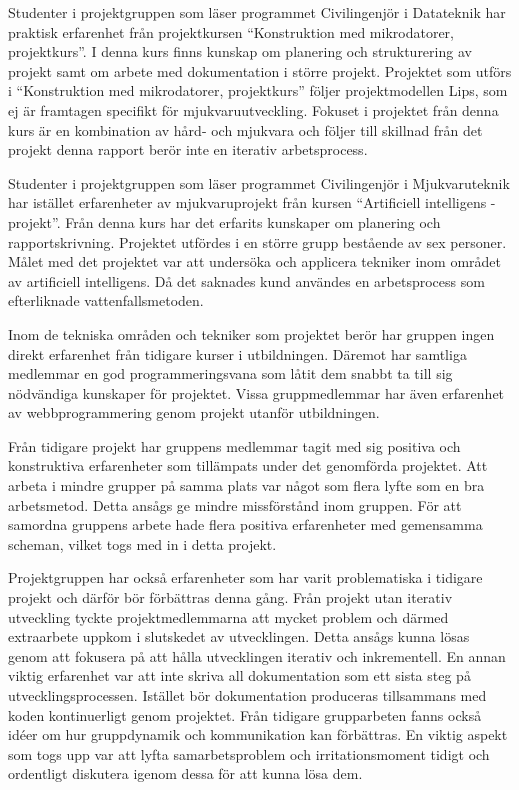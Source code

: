 Studenter i projektgruppen som läser programmet Civilingenjör i Datateknik har praktisk erfarenhet från projektkursen ``Konstruktion med mikrodatorer, projektkurs''.\cite{tsea29} I denna kurs finns kunskap om planering och strukturering av projekt samt om arbete med dokumentation i större projekt. Projektet som utförs i ``Konstruktion med mikrodatorer, projektkurs'' följer projektmodellen Lips\cite{lips}, som ej är framtagen specifikt för mjukvaruutveckling. Fokuset i projektet från denna kurs är en kombination av hård- och mjukvara och följer till skillnad från det projekt denna rapport berör inte en iterativ arbetsprocess.

Studenter i projektgruppen som läser programmet Civilingenjör i Mjukvaruteknik har istället erfarenheter av mjukvaruprojekt från kursen ``Artificiell intelligens - projekt''.\cite{tddd92} Från denna kurs har det erfarits kunskaper om planering och rapportskrivning. Projektet utfördes i en större grupp bestående av sex personer. Målet med det projektet var att undersöka och applicera tekniker inom området av artificiell intelligens. Då det saknades kund användes en arbetsprocess som efterliknade vattenfallsmetoden.

Inom de tekniska områden och tekniker som projektet berör har gruppen ingen direkt erfarenhet från tidigare kurser i utbildningen. Däremot har samtliga medlemmar en god programmeringsvana som låtit dem snabbt ta till sig nödvändiga kunskaper för projektet. Vissa gruppmedlemmar har även erfarenhet av webbprogrammering genom projekt utanför utbildningen.

Från tidigare projekt har gruppens medlemmar tagit med sig positiva och konstruktiva erfarenheter som tillämpats under det genomförda projektet. Att arbeta i mindre grupper på samma plats var något som flera lyfte som en bra arbetsmetod. Detta ansågs ge mindre missförstånd inom gruppen. För att samordna gruppens arbete hade flera positiva erfarenheter med gemensamma scheman, vilket togs med in i detta projekt.

Projektgruppen har också erfarenheter som har varit problematiska i tidigare projekt och därför bör förbättras denna gång. Från projekt utan iterativ utveckling tyckte projektmedlemmarna att mycket problem och därmed extraarbete uppkom i slutskedet av utvecklingen. Detta ansågs kunna lösas genom att fokusera på att hålla utvecklingen iterativ och inkrementell. En annan viktig erfarenhet var att inte skriva all dokumentation som ett sista steg på utvecklingsprocessen. Istället bör dokumentation produceras tillsammans med koden kontinuerligt genom projektet. Från tidigare grupparbeten fanns också idéer om hur gruppdynamik och kommunikation kan förbättras. En viktig aspekt som togs upp var att lyfta samarbetsproblem och irritationsmoment tidigt och ordentligt diskutera igenom dessa för att kunna lösa dem.
